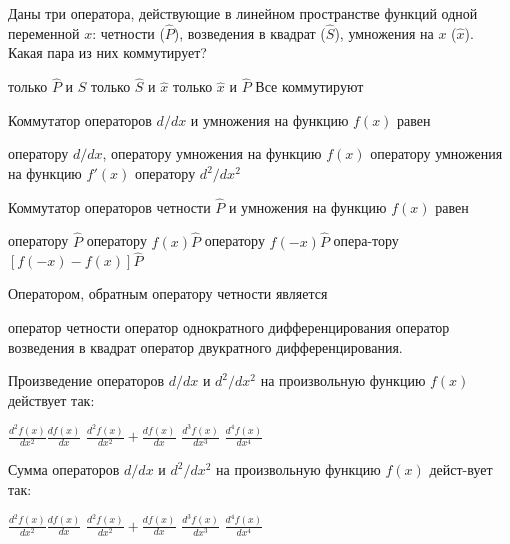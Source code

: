 \documentclass[11pt,a4paper]{exam}
\begin{document}
\begin{questions}
\question Даны три оператора, действующие в линейном пространстве функций одной переменной $x$: четности ($\hat{P}$), возведения в квадрат ($\hat{S}$), умножения на $x$ ($\hat{x}$). Какая пара из них коммутирует?
\begin{choices}
\choice только $\hat{P}$ и $\hat{S}$      
\choice только $\hat{S}$ и $\hat{x}$      
\choice только $\hat{x}$ и $\hat{P}$      
\choice Все коммутируют
\end{choices}

\question Коммутатор операторов $d/dx$ и умножения на функцию $f(x)$ равен
\begin{choices}
\choice оператору $d/dx$,                 
\choice оператору умножения на функцию $f(x)$
\choice оператору умножения на функцию ${f}'(x)$      
\choice оператору ${{d}^{2}}/d{{x}^{2}}$
\end{choices}

\question Коммутатор операторов четности $\hat{P}$ и умножения на функцию $f(x)$ равен
\begin{choices}
\choice оператору $\hat{P}$   
\choice оператору $f(x)\hat{P}$       
\choice оператору $f(-x)\hat{P}$ 
\choice опера-тору $[f(-x)-f(x)]\hat{P}$
\end{choices}

\question Оператором, обратным оператору четности является
\begin{choices}
\choice оператор четности           
\choice оператор однократного дифференцирования
\choice оператор возведения в квадрат        
\choice оператор двукратного дифференцирования.
\end{choices}

\question Произведение операторов $d/dx$ и ${{d}^{2}}/d{{x}^{2}}$ на произвольную функцию $f(x)$ действует так:
\begin{choices}
\choice $\frac{{{d}^{2}}f(x)}{d{{x}^{2}}}\frac{df(x)}{dx}$     
\choice $\frac{{{d}^{2}}f(x)}{d{{x}^{2}}}+\frac{df(x)}{dx}$    
\choice $\frac{{{d}^{3}}f(x)}{d{{x}^{3}}}$      
\choice $\frac{{{d}^{4}}f(x)}{d{{x}^{4}}}$
\end{choices}

\question Сумма операторов $d/dx$ и ${{d}^{2}}/d{{x}^{2}}$ на произвольную функцию $f(x)$ дейст-вует так:
\begin{choices}
\choice $\frac{{{d}^{2}}f(x)}{d{{x}^{2}}}\frac{df(x)}{dx}$     
\choice $\frac{{{d}^{2}}f(x)}{d{{x}^{2}}}+\frac{df(x)}{dx}$    
\choice $\frac{{{d}^{3}}f(x)}{d{{x}^{3}}}$      
\choice $\frac{{{d}^{4}}f(x)}{d{{x}^{4}}}$
\end{choices}


\end{questions}
\end{document}
